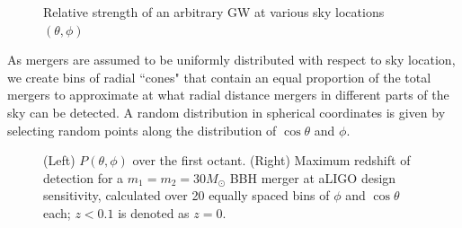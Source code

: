 \documentclass{article}
\begin{document}
\begin{figure}[!htb]
    \caption{\label{fig:spherical} Relative strength of an arbitrary GW at various sky locations $(\theta, \phi)$}
\end{figure}

As mergers are assumed to be uniformly distributed with respect to sky location, we create bins of radial ``cones" that contain an equal proportion of the total mergers to approximate at what radial distance mergers in different parts of the sky can be detected. A random distribution in spherical coordinates is given by selecting random points along the distribution of $\cos \theta$ and $\phi$. 

\begin{figure}[!htb]
    \caption{\label{fig:distance} (Left) $P(\theta, \phi)$ over the first octant. (Right) Maximum redshift of detection for a $m_1 = m_2 = 30 M_\odot$ BBH merger at aLIGO design sensitivity, calculated over 20 equally spaced bins of $\phi$ and $\cos \theta$ each; $z < 0.1$ is denoted as $z=0$.}
\end{figure}
\end{document}
